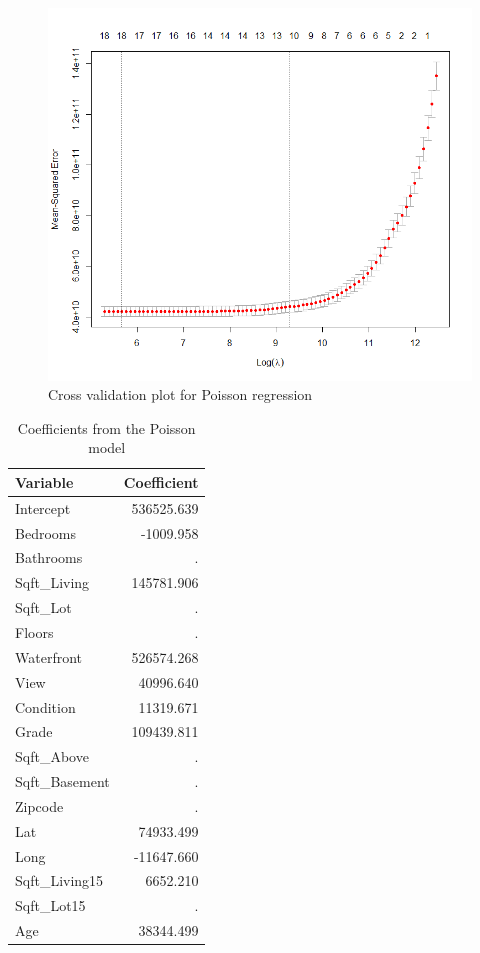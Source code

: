 \documentclass[a4paper, 11pt]{article}
\begin{document}
\begin{figure}[H]
\includegraphics[scale=0.65]{MGLMcv}
\centering
\caption{Cross validation plot for Poisson regression}
\label{fig:MGLMcv}
\end{figure}


\begin{table}[ht] \centering \begin{tabular}{|l | r|} \hline \textbf{Variable} & \textbf{Coefficient} \\ \hline Intercept & 536525.639 \\ Bedrooms & -1009.958 \\ Bathrooms & . \\ Sqft\_Living & 145781.906 \\ Sqft\_Lot & . \\ Floors & . \\ Waterfront & 526574.268 \\ View & 40996.640 \\ Condition & 11319.671 \\ Grade & 109439.811 \\ Sqft\_Above & . \\ Sqft\_Basement & . \\ Zipcode & . \\ Lat & 74933.499 \\ Long & -11647.660 \\ Sqft\_Living15 & 6652.210 \\ Sqft\_Lot15 & . \\ Age & 38344.499 \\ \hline \end{tabular} \caption{Coefficients from the Poisson model} \label{tab:glmcoefs} \end{table}
\end{document}
